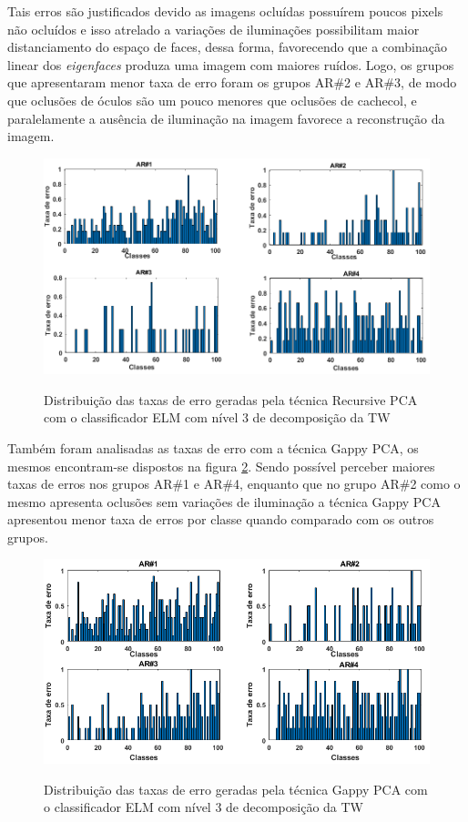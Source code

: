 Tais erros são justificados devido as imagens ocluídas possuírem poucos pixels não ocluídos e isso atrelado a variações de iluminações possibilitam maior distanciamento do espaço de faces, dessa forma, favorecendo que a combinação linear dos \textit{eigenfaces} produza uma imagem com maiores ruídos. Logo, os grupos que apresentaram menor taxa de erro foram os grupos AR\#2 e AR\#3, de modo que oclusões de óculos são um pouco menores que oclusões de cachecol, e paralelamente a ausência de iluminação na imagem favorece a reconstrução da imagem.

\begin{figure}[H]
\centering
\caption{Distribuição das taxas de erro geradas pela técnica Recursive PCA com o classificador ELM com nível 3 de decomposição da TW}
\includegraphics[scale=0.50]{imgs3/taxa_erro_REC_PCA.png}
\label{fig:taxa_erro_REC_PCA}
\end{figure}

Também foram analisadas as taxas de erro com a técnica Gappy PCA, os mesmos encontram-se dispostos na figura \ref{fig:taxa_erro_GPCA}. Sendo possível perceber maiores taxas de erros nos grupos AR\#1 e AR\#4, enquanto que no grupo AR\#2 como o mesmo apresenta oclusões sem variações de iluminação a técnica Gappy PCA apresentou menor taxa de erros por classe quando comparado com os outros grupos.  

\begin{figure}[H]
\centering
\caption{Distribuição das taxas de erro geradas pela técnica Gappy PCA com o classificador ELM com nível 3 de decomposição da TW}
\includegraphics[scale=0.60]{imgs4/erro_GPCA_AR}
\label{fig:taxa_erro_GPCA}
\end{figure}


